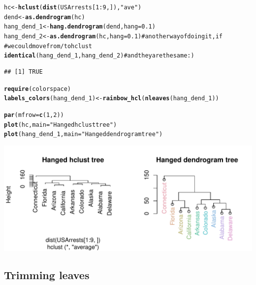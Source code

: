 \documentclass[shortnames,nojss,article]{jss}\usepackage{graphicx, color}
\makeatletter
\def\maxwidth{ %
  \ifdim\Gin@nat@width>\linewidth
    \linewidth
  \else
    \Gin@nat@width
  \fi
}
\newcommand{\hlfunctioncall}[1]{\textcolor[rgb]{0.501960784313725,0,0.329411764705882}{\textbf{#1}}}%
\newcommand{\hlstring}[1]{\textcolor[rgb]{0.6,0.6,1}{#1}}%
\newcommand{\hlcomment}[1]{\textcolor[rgb]{0.180392156862745,0.6,0.341176470588235}{#1}}%
\newenvironment{kframe}{%
 \def\at@end@of@kframe{}%
 \ifinner\ifhmode%
  \def\at@end@of@kframe{\end{minipage}}%
  \begin{minipage}{\columnwidth}%
 \fi\fi%
 \def\FrameCommand##1{\hskip\@totalleftmargin \hskip-\fboxsep
 \colorbox{shadecolor}{##1}\hskip-\fboxsep
     \hskip-\linewidth \hskip-\@totalleftmargin \hskip\columnwidth}%
 \MakeFramed {\advance\hsize-\width
   \@totalleftmargin\z@ \linewidth\hsize
   \@setminipage}}%
 {\par\unskip\endMakeFramed%
 \at@end@of@kframe}
\newenvironment{knitrout}{}{} %
\makeatother
\begin{document}
\begin{knitrout}
\color{fgcolor}\begin{kframe}
\begin{alltt}

hc <- \hlfunctioncall{hclust}(\hlfunctioncall{dist}(USArrests[1:9, ]), \hlstring{"ave"})
dend <- \hlfunctioncall{as.dendrogram}(hc)
hang_dend_1 <- \hlfunctioncall{hang.dendrogram}(dend, hang = 0.1)
hang_dend_2 <- \hlfunctioncall{as.dendrogram}(hc, hang = 0.1)  \hlcomment{# another way of doing it, if}
\hlcomment{# we could move from/to hclust}
\hlfunctioncall{identical}(hang_dend_1, hang_dend_2)  \hlcomment{# and they are the same :)}
\end{alltt}
\begin{verbatim}
## [1] TRUE
\end{verbatim}
\begin{alltt}

\hlfunctioncall{require}(colorspace)
\hlfunctioncall{labels_colors}(hang_dend_1) <- \hlfunctioncall{rainbow_hcl}(\hlfunctioncall{nleaves}(hang_dend_1))

\hlfunctioncall{par}(mfrow = \hlfunctioncall{c}(1, 2))
\hlfunctioncall{plot}(hc, main = \hlstring{"Hanged hclust tree"})
\hlfunctioncall{plot}(hang_dend_1, main = \hlstring{"Hanged dendrogram tree"})
\end{alltt}
\end{kframe}

{\centering \includegraphics[width=\maxwidth]{figure/unnamed-chunk-27} 

}



\end{knitrout}




\subsection{Trimming leaves}
\end{document}
